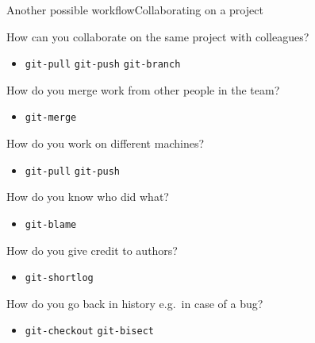 \documentclass[usenames,svgnames,14pt]{beamer}
\begin{document}
\begin{frame}{Another possible workflow}{Collaborating on a project}
    \begin{customlist}{5mm}
        \item How can you collaborate on the same project with colleagues?
              \begin{itemize}
                  \item \texttt{git-pull} \quad \texttt{git-push} \quad \texttt{git-branch}
              \end{itemize}
        \item How do you merge work from other people in the team?
              \begin{itemize}
                  \item \texttt{git-merge}
              \end{itemize}
        \item How do you work on different machines?
              \begin{itemize}
                  \item \texttt{git-pull} \quad \texttt{git-push}
              \end{itemize}
        \item How do you know who did what?
              \begin{itemize}
                  \item \texttt{git-blame}
              \end{itemize}
        \item How do you give credit to authors?
              \begin{itemize}
                  \item \texttt{git-shortlog}
              \end{itemize}
        \item How do you go back in history e.g.\ in case of a bug?
              \begin{itemize}
                  \item \texttt{git-checkout} \quad \texttt{git-bisect}
              \end{itemize}
    \end{customlist}
\end{frame}
\end{document}
